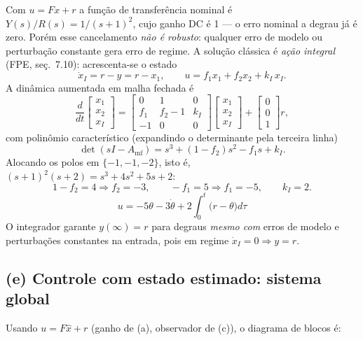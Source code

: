 \documentclass[11pt,a4paper]{article}
\begin{document}
Com $u=Fx+r$ a fun\c{c}\~ao de transfer\^encia nominal \'e
$Y(s)/R(s)=1/(s+1)^2$, cujo ganho DC \'e 1 --- o erro nominal a degrau j\'a \'e zero.
Por\'em esse cancelamento \emph{n\~ao \'e robusto}: qualquer erro de modelo ou
perturba\c{c}\~ao constante gera erro de regime. A solu\c{c}\~ao cl\'assica \'e
\emph{a\c{c}\~ao integral} (FPE, se\c{c}.~7.10): acrescenta-se o estado
\[
\dot{x}_I=r-y=r-x_1,
\qquad
u=f_1x_1+f_2x_2+k_I\,x_I .
\]
A din\^amica aumentada em malha fechada \'e
\[
\frac{d}{dt}\!\begin{bmatrix}x_1\\x_2\\x_I\end{bmatrix}
=\begin{bmatrix}0&1&0\\ f_1& f_2-1 & k_I\\ -1&0&0\end{bmatrix}
\begin{bmatrix}x_1\\x_2\\x_I\end{bmatrix}
+\begin{bmatrix}0\\0\\1\end{bmatrix}r ,
\]
com polin\^omio caracter\'istico (expandindo o determinante pela terceira linha)
\[
\det(sI-A_{\mathrm{mf}})=s^3+(1-f_2)s^2-f_1s+k_I .
\]
Alocando os polos em $\{-1,-1,-2\}$, isto \'e,
$(s+1)^2(s+2)=s^3+4s^2+5s+2$:
\[
1-f_2=4\Rightarrow f_2=-3,\qquad
-f_1=5\Rightarrow f_1=-5,\qquad
k_I=2 .
\]
\[
\boxed{\;u=-5\theta-3\dot\theta+2\!\int_0^t\!\big(r-\theta\big)d\tau\;}
\]
O integrador garante $y(\infty)=r$ para degraus \emph{mesmo com} erros de modelo e
perturba\c{c}\~oes constantes na entrada, pois em regime $\dot x_I=0\Rightarrow y=r$.

\subsection*{(e) Controle com estado estimado: sistema global}

Usando $u=F\hat{x}+r$ (ganho de (a), observador de (c)), o diagrama de blocos \'e:

\begin{center}
\end{center}
\end{document}
